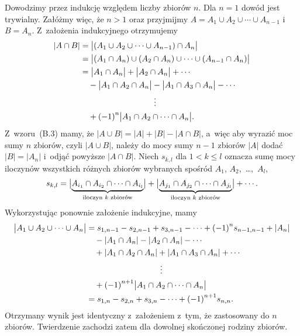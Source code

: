 \exercise %
Dowodzimy przez indukcję względem liczby zbiorów $n$. Dla $n=1$ dowód jest trywialny. Załóżmy więc, że $n>1$ oraz przyjmijmy $A=A_1\cup A_2\cup\cdots\cup A_{n-1}$ i~$B=A_n$. Z~założenia indukcyjnego otrzymujemy
\[
	\begin{split}
		|A\cap B| &= \bigl|(A_1\cup A_2\cup\cdots\cup A_{n-1})\cap A_n\bigr| \\
		&= \bigl|(A_1\cap A_n)\cup(A_2\cap A_n)\cup\cdots\cup(A_{n-1}\cap A_n)\bigr| \\
		&= \bigl|A_1\cap A_n\bigr|+\bigl|A_2\cap A_n\bigr|+\cdots{} \\
		&\quad {}-\bigl|A_1\cap A_2\cap A_n\bigr|-\bigl|A_1\cap A_3\cap A_n\bigr|-\cdots{} \\
		&\hspace{1.25in}\vdots \\
		&\quad {}+{(-1)}^n\bigl|A_1\cap A_2\cap\cdots\cap A_n\bigr|.
	\end{split}
\]
Z~wzoru~(B.3) mamy, że $|A\cup B|=|A|+|B|-|A\cap B|$, a~więc aby wyrazić moc sumy $n$ zbiorów, czyli $|A\cup B|$, należy do mocy sumy $n-1$ zbiorów $|A|$ dodać $|B|=|A_n|$ i~odjąć powyższe $|A\cap B|$. Niech $s_{k,l}$ dla $1<k\le l$ oznacza sumę mocy iloczynów wszystkich  różnych zbiorów wybranych spośród $A_1$, $A_2$,~\dots,~$A_l$,
\[
 	s_{k,l} = \bigl|\underbrace{A_{i_1}\cap A_{i_2}\cap\cdots\cap A_{i_l}}_{\text{\scriptsize iloczyn $k$ zbiorów}}\bigr|+\bigl|\underbrace{A_{j_1}\cap A_{j_2}\cap\cdots\cap A_{j_l}}_{\text{\scriptsize iloczyn $k$ zbiorów}}\bigr|+\cdots{}.
\]
Wykorzystując ponownie założenie indukcyjne, mamy
\[
	\begin{split}
		\bigl|A_1\cup A_2\cup\cdots\cup A_n\bigr| &= s_{1,{n-1}}-s_{2,{n-1}}+s_{3,{n-1}}-\cdots+{(-1)}^ns_{{n-1},{n-1}}+|A_n| \\
		&\quad {}-|A_1\cap A_n|-|A_2\cap A_n|-\cdots{} \\
		&\quad {}+|A_1\cap A_2\cap A_n|+|A_1\cap A_3\cap A_n|+\cdots{} \\
		&\hspace{1.25in}\vdots \\
		&\quad {}+{(-1)}^{n+1}\bigl|A_1\cap A_2\cap\cdots\cap A_n\bigr| \\
		&= s_{1,n}-s_{2,n}+s_{3,n}-\cdots+{(-1)}^{n+1}s_{n,n}.
	\end{split}
\]
Otrzymany wynik jest identyczny z~założeniem z~tym, że zastosowany do $n$ zbiorów. Twierdzenie zachodzi zatem dla dowolnej skończonej rodziny zbiorów.

\exercise %

